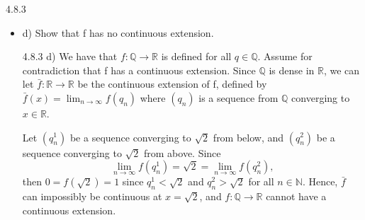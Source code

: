 \documentclass[a4paper,norsk]{article}
\renewcommand{\geq}{\geqslant}
\renewcommand{\epsilon}{\varepsilon}
\begin{document}
\begin{oppgavebox}{4.8.3}{}
\begin{itemize}
\begin{proofbox}{4.8.3 c)}{}
    Hence f is continuous for all $ q \in \mathbb{Q} $.




    Is f uniform continuous? No, because if $ q_1 < \sqrt{ 2 } $  and $ q_2 > \sqrt{ 2 } $, then given $ \delta  > 0 $, there exists $ \epsilon > 0 $  such that $ \left| q_1 - q_1 \right| < \delta  \Rightarrow \left| f(q_1) - f(q_2) \right| = 1 \geq \epsilon$. Hence, f is not uniformly continuous. 
  \end{proofbox}

  \item d) Show that f has no continuous extension.
  \begin{proofbox}{4.8.3 d)}{}
    We have that $ f : \mathbb{Q} \to \mathbb{R} $ is defined for all $ q \in \mathbb{Q} $. Assume for contradiction that f has a continuous extension. Since $ \mathbb{Q} $ is dense in $ \mathbb{R} $, we can let $ \bar{f} : \mathbb{R} \to \mathbb{R} $  be the continuous extension of f, defined by $ \bar{f}(x) = \lim_{n \to \infty} f(q_n)  $ where $ \left( q_n \right)  $ is a sequence from $ \mathbb{Q} $ converging to $ x \in \mathbb{R} $. 


    Let $ \left( q_n^1 \right)  $ be a sequence converging to $ \sqrt{ 2 } $ from below, and $ \left( q_n^2 \right)  $  be a sequence converging to $ \sqrt{ 2 } $ from above. Since
    \[
        \lim_{n \to \infty} f(q_n^1) = \sqrt{ 2 } = \lim_{n \to \infty} f(q_n^2),
    \]
    then $ 0 = f( \sqrt{ 2 }) = 1$ since $ q_n^1 < \sqrt{ 2 } $ and $ q_n^2 > \sqrt{ 2 } $ for all $n \in \mathbb{N} $. Hence, $ \bar{f} $ can impossibly be continuous at $ x =\sqrt{ 2 } $, and $ f : \mathbb{Q} \to \mathbb{R} $ cannot have a continuous extension.
    
  \end{proofbox}
  
\end{itemize}
\end{oppgavebox}
\end{document}

